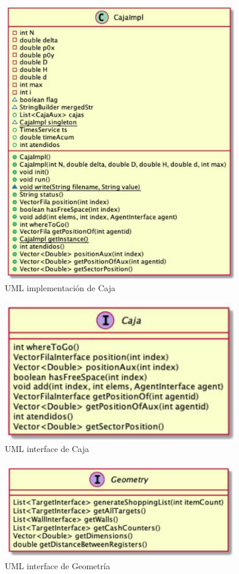 \documentclass{article}
\begin{document}
\begin{figure}[h]
\begin{center}
\includegraphics[width=4in]{./images/claseCajaImpl.PNG}
\caption{UML implementación de Caja }
\label{cajaImpl}
\end{center}
\end{figure}

\begin{figure}[h]
\begin{center}
\includegraphics[width=4in]{./images/interfaceCaja.PNG}
\caption{UML interface de Caja }
\label{interfaceCaja}
\end{center}
\end{figure}

\begin{figure}[h]
\begin{center}
\includegraphics[width=4in]{./images/interfaceGeometry.PNG}
\caption{UML interface de Geometría }
\label{interfaceGeomety}
\end{center}
\end{figure}
\end{document}
